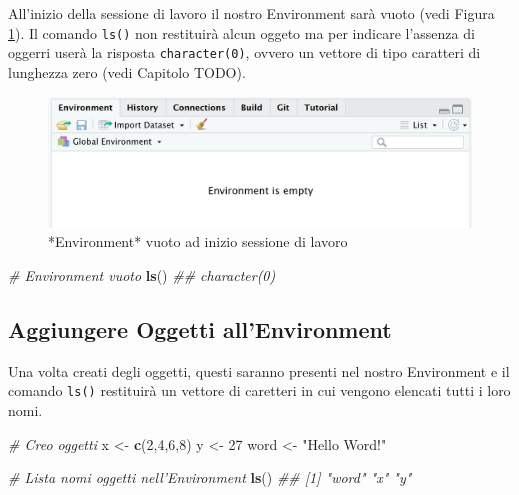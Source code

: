 \documentclass[
]{book}
\newenvironment{Shaded}{\begin{snugshade}}{\end{snugshade}}
\newcommand{\CommentTok}[1]{\textcolor[rgb]{0.56,0.35,0.01}{\textit{#1}}}
\newcommand{\DecValTok}[1]{\textcolor[rgb]{0.00,0.00,0.81}{#1}}
\newcommand{\KeywordTok}[1]{\textcolor[rgb]{0.13,0.29,0.53}{\textbf{#1}}}
\newcommand{\NormalTok}[1]{#1}
\newcommand{\StringTok}[1]{\textcolor[rgb]{0.31,0.60,0.02}{#1}}
\begin{document}
All'inizio della sessione di lavoro il nostro Environment sarà vuoto (vedi Figura \ref{fig:environment-empty}). Il comando \texttt{ls()} non restituirà alcun oggeto ma per indicare l'assenza di oggerri userà la risposta \texttt{character(0)}, ovvero un vettore di tipo caratteri di lunghezza zero (vedi Capitolo TODO).

\begin{figure}

{\centering \includegraphics[width=0.6\linewidth]{images/environment-empty} 

}

\caption{*Environment* vuoto ad inizio sessione di lavoro}\label{fig:environment-empty}
\end{figure}

\begin{Shaded}
\begin{Highlighting}[]
\CommentTok{# Environment vuoto}
\KeywordTok{ls}\NormalTok{()}
\CommentTok{## character(0)}
\end{Highlighting}
\end{Shaded}

\hypertarget{aggiungere-oggetti-allenvironment}{%
\subsection{Aggiungere Oggetti all'Environment}\label{aggiungere-oggetti-allenvironment}}

Una volta creati degli oggetti, questi saranno presenti nel nostro Environment e il comando \texttt{ls()} restituirà un vettore di caretteri in cui vengono elencati tutti i loro nomi.

\begin{Shaded}
\begin{Highlighting}[]
\CommentTok{# Creo oggetti}
\NormalTok{x <-}\StringTok{  }\KeywordTok{c}\NormalTok{(}\DecValTok{2}\NormalTok{,}\DecValTok{4}\NormalTok{,}\DecValTok{6}\NormalTok{,}\DecValTok{8}\NormalTok{)}
\NormalTok{y <-}\StringTok{  }\DecValTok{27}
\NormalTok{word <-}\StringTok{ "Hello Word!"}

\CommentTok{# Lista nomi oggetti nell'Environment}
\KeywordTok{ls}\NormalTok{()}
\CommentTok{## [1] "word" "x"    "y"}
\end{Highlighting}
\end{Shaded}
\end{document}
